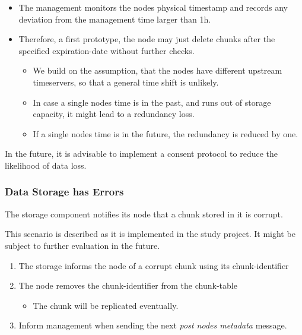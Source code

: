 \begin{itemize}
    \item The \gls{management} monitors the \glspl{node} physical timestamp and records any deviation from the \gls{management} time larger than 1h.
    \item Therefore, a first prototype, the \gls{node} may just delete \glspl{chunk} after the specified \gls{expiration-date} without further checks.
        \begin{itemize}
            \item We build on the assumption, that the \glspl{node} have different upstream timeservers, so that a general time shift is unlikely.
            \item In case a single \gls{node}s time is in the past, and runs out of storage capacity, it might lead to a redundancy loss.
            \item If a single \gls{node}s time is in the future, the redundancy is reduced by one.
        \end{itemize}
\end{itemize}

In the future, it is advisable to implement a consent protocol to reduce the likelihood of data loss.

\subsubsection{Data Storage has Errors}\label{sec:scenario-storage-errors}
The \gls{storage} component notifies its \gls{node} that a \gls{chunk} stored in it is corrupt.

This scenario is described as it is implemented in the study project. It might be subject to further evaluation in the future.

\begin{enumerate}
    \item The \gls{storage} informs the \gls{node} of a corrupt \gls{chunk} using its \gls{chunk-identifier}
    \item The \gls{node} removes the \gls{chunk-identifier} from the \gls{chunk-table}
        \begin{itemize}
            \item The \gls{chunk} will be replicated eventually.
        \end{itemize}
    \item Inform \gls{management} when sending the next \emph{post nodes metadata} message.
\end{enumerate}

